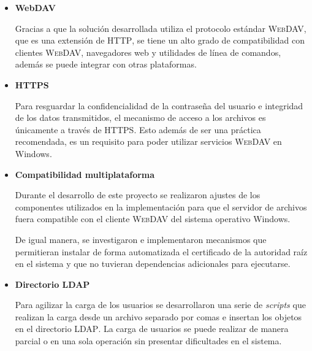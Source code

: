 \begin{itemize}
  \item \textbf{WebDAV}

Gracias a que la soluci\'{o}n desarrollada utiliza el protocolo est\'{a}ndar \textsc{\gls{WebDAV}}, que es una extensi\'{o}n de \textsc{\gls{HTTP}}, se tiene un alto grado de compatibilidad con clientes \textsc{\gls{WebDAV}}, navegadores web y utilidades de l\'{i}nea de comandos, adem\'{a}s se puede integrar con otras plataformas.

  \item \textbf{HTTPS}

Para resguardar la confidencialidad de la contrase\~{n}a del usuario e integridad de los datos transmitidos, el mecanismo de acceso a los archivos es \'{u}nicamente a trav\'{e}s de \textsc{\gls{HTTPS}}. Esto adem\'{a}s de ser una pr\'{a}ctica recomendada, es un requisito para poder utilizar servicios \textsc{\gls{WebDAV}} en Windows.

  \item \textbf{Compatibilidad multiplataforma}

Durante el desarrollo de este proyecto se realizaron ajustes de los componentes utilizados en la implementaci\'{o}n para que el servidor de archivos fuera compatible con el cliente \textsc{\gls{WebDAV}} del sistema operativo Windows.

De igual manera, se investigaron e implementaron mecanismos que permitieran instalar de forma automatizada el certificado de la autoridad ra\'{i}z en el sistema y que no tuvieran dependencias adicionales para ejecutarse.

  \item \textbf{Directorio LDAP}


Para agilizar la carga de los usuarios se desarrollaron una serie de \emph{\glspl{script}} que realizan la carga desde un archivo separado por comas e insertan los objetos en el directorio \textsc{\gls{LDAP}}. La carga de usuarios se puede realizar de manera parcial o en una sola operaci\'{o}n sin presentar dificultades en el sistema.


\end{itemize}


